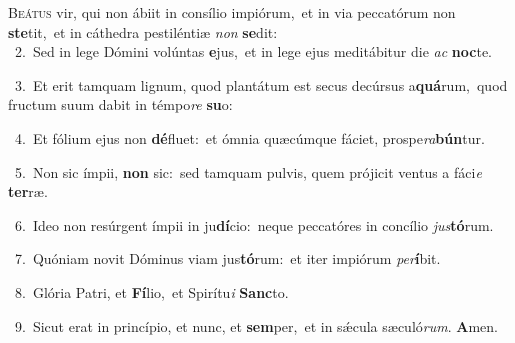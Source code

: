 \lettrine{\initial\textcolor{\initialcolor}{B}}{eátus} vir, qui non ábiit in consílio impiórum,~\dagger et in via peccatórum non \textbf{ste}\-tit,~\star et in cáthedra pestiléntiæ \textit{non} \textbf{se}\-dit:\\
{\numbfont\textcolor{\numbcolor}{~2.}}~Sed in lege Dómini volúntas \textbf{e}\-jus,~\star et in lege ejus meditábitur die \textit{ac} \textbf{noc}\-te.\par
{\numbfont\textcolor{\numbcolor}{~3.}}~Et erit tamquam lignum, quod plantátum est secus decúrsus a\-\textbf{quá}\-rum,~\star quod fructum suum dabit in témpo\textit{re} \textbf{su}\-o:\par
{\numbfont\textcolor{\numbcolor}{~4.}}~Et fólium ejus non \textbf{dé}\-fluet:~\star et ómnia quæcúmque fáciet, prospe\-\textit{ra}\-\textbf{bún}tur.\par
{\numbfont\textcolor{\numbcolor}{~5.}}~Non sic ímpii, \textbf{non} sic:~\star sed tamquam pulvis, quem prójicit ventus a fáci\textit{e} \textbf{ter}\-ræ.\par
{\numbfont\textcolor{\numbcolor}{~6.}}~Ideo non resúrgent ímpii in ju\-\textbf{dí}\-cio:~\star neque peccatóres in concílio \textit{jus}\-\textbf{tó}rum.\par
{\numbfont\textcolor{\numbcolor}{~7.}}~Quóniam novit Dóminus viam jus\-\textbf{tó}\-rum:~\star et iter impiórum \textit{per}\-\textbf{í}bit.\par
{\numbfont\textcolor{\numbcolor}{~8.}}~Glória Patri, et \textbf{Fí}\-lio,~\star et Spirítu\textit{i} \textbf{Sanc}\-to.\par
{\numbfont\textcolor{\numbcolor}{~9.}}~Sicut erat in princípio, et nunc, et \textbf{sem}\-per,~\star et in sǽcula sæculó\-\textit{rum}\-. \textbf{A}\-men.\par
